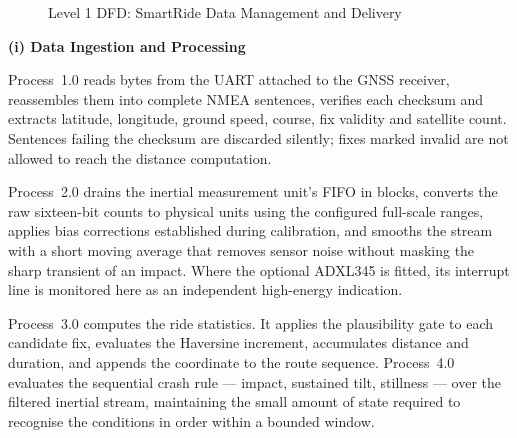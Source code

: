 \documentclass[12pt,a4paper,oneside]{report}
\begin{document}
\begin{figure}[htbp]
\caption{Level 1 DFD: SmartRide Data Management and Delivery}
\end{figure}

\vspace{0.5em}
\noindent\textbf{(i) Data Ingestion and Processing}

Process~1.0 reads bytes from the UART attached to the GNSS receiver, reassembles them into
complete NMEA sentences, verifies each checksum and extracts latitude, longitude, ground
speed, course, fix validity and satellite count. Sentences failing the checksum are
discarded silently; fixes marked invalid are not allowed to reach the distance computation.

Process~2.0 drains the inertial measurement unit's FIFO in blocks, converts the raw
sixteen-bit counts to physical units using the configured full-scale ranges, applies bias
corrections established during calibration, and smooths the stream with a short moving
average that removes sensor noise without masking the sharp transient of an impact. Where
the optional ADXL345 is fitted, its interrupt line is monitored here as an independent
high-energy indication.

Process~3.0 computes the ride statistics. It applies the plausibility gate to each candidate
fix, evaluates the Haversine increment, accumulates distance and duration, and appends the
coordinate to the route sequence. Process~4.0 evaluates the sequential crash rule --- impact,
sustained tilt, stillness --- over the filtered inertial stream, maintaining the small amount
of state required to recognise the conditions in order within a bounded window.
\end{document}
